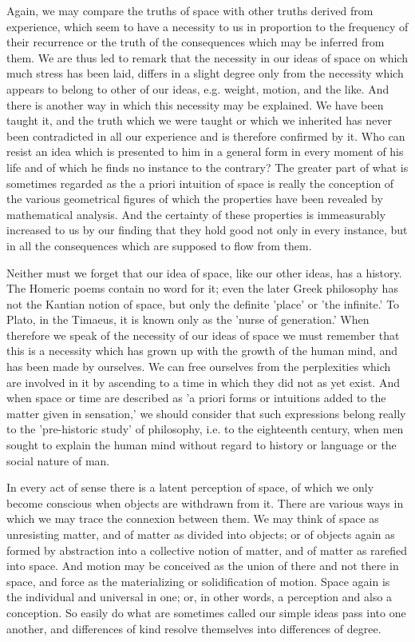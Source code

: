 Again, we may compare the truths of space with other truths derived from
experience, which seem to have a necessity to us in proportion to the
frequency of their recurrence or the truth of the consequences which may
be inferred from them. We are thus led to remark that the necessity
in our ideas of space on which much stress has been laid, differs in a
slight degree only from the necessity which appears to belong to other
of our ideas, e.g. weight, motion, and the like. And there is another
way in which this necessity may be explained. We have been taught it,
and the truth which we were taught or which we inherited has never been
contradicted in all our experience and is therefore confirmed by it. Who
can resist an idea which is presented to him in a general form in every
moment of his life and of which he finds no instance to the contrary?
The greater part of what is sometimes regarded as the a priori intuition
of space is really the conception of the various geometrical figures of
which the properties have been revealed by mathematical analysis. And
the certainty of these properties is immeasurably increased to us by our
finding that they hold good not only in every instance, but in all the
consequences which are supposed to flow from them.

Neither must we forget that our idea of space, like our other ideas,
has a history. The Homeric poems contain no word for it; even the later
Greek philosophy has not the Kantian notion of space, but only the
definite 'place' or 'the infinite.' To Plato, in the Timaeus, it is
known only as the 'nurse of generation.' When therefore we speak of
the necessity of our ideas of space we must remember that this is a
necessity which has grown up with the growth of the human mind, and
has been made by ourselves. We can free ourselves from the perplexities
which are involved in it by ascending to a time in which they did not
as yet exist. And when space or time are described as 'a priori forms or
intuitions added to the matter given in sensation,' we should consider
that such expressions belong really to the 'pre-historic study' of
philosophy, i.e. to the eighteenth century, when men sought to explain
the human mind without regard to history or language or the social
nature of man.

In every act of sense there is a latent perception of space, of which
we only become conscious when objects are withdrawn from it. There are
various ways in which we may trace the connexion between them. We may
think of space as unresisting matter, and of matter as divided into
objects; or of objects again as formed by abstraction into a collective
notion of matter, and of matter as rarefied into space. And motion may
be conceived as the union of there and not there in space, and force
as the materializing or solidification of motion. Space again is the
individual and universal in one; or, in other words, a perception and
also a conception. So easily do what are sometimes called our simple
ideas pass into one another, and differences of kind resolve themselves
into differences of degree.

